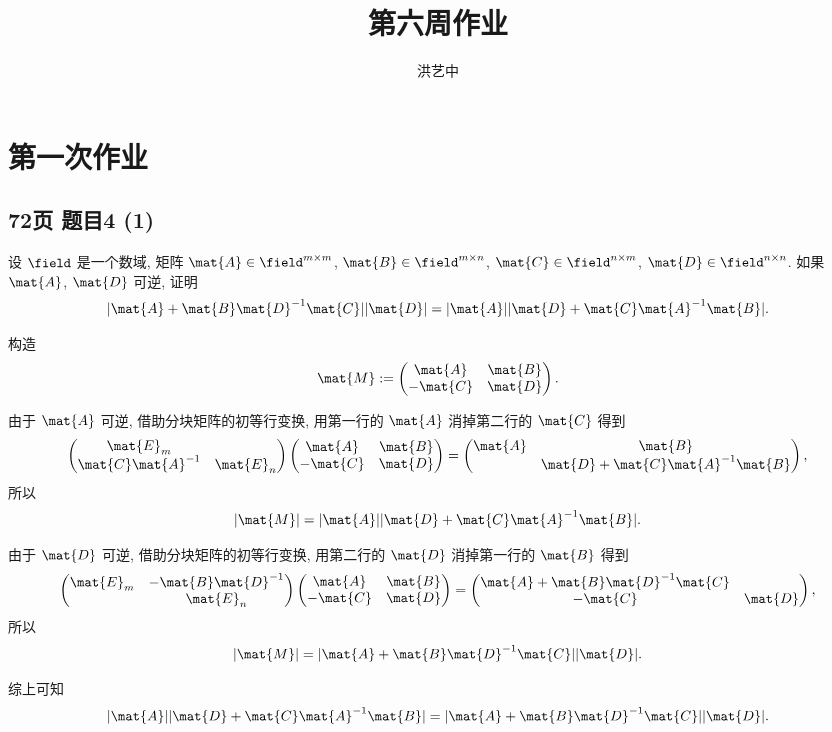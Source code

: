 \title{第六周作业}
\author{洪艺中}
\maketitle
\section{第一次作业}
\subsection*{72页 题目4 (1)}
\begin{problem*}
设 $\field$ 是一个数域, 矩阵 $\mat{A} \in \field^{m \times m}$, $\mat{B} \in \field^{m \times n}$, $\mat{C} \in \field^{n \times m}$, $\mat{D} \in \field^{n \times n}$. 如果 $\mat{A}$, $\mat{D}$ 可逆, 证明
\[
|\mat{A} + \mat{B}\mat{D}^{-1}\mat{C}||\mat{D}| = |\mat{A}||\mat{D} + \mat{C}\mat{A}^{-1}\mat{B}|.
\]
\end{problem*}
\begin{solution}
构造
\[
\mat{M} := 
\begin{pmatrix}
    \mat{A} & \mat{B} \\
    -\mat{C} & \mat{D}
\end{pmatrix}.
\]

由于 $\mat{A}$ 可逆, 借助分块矩阵的初等行变换, 用第一行的 $\mat{A}$ 消掉第二行的 $\mat{C}$ 得到
\[
\begin{pmatrix}
    \mat{E}_m &  \\
    \mat{C}\mat{A}^{-1} & \mat{E}_n
\end{pmatrix}
\begin{pmatrix}
    \mat{A} & \mat{B} \\
    -\mat{C} & \mat{D}
\end{pmatrix}
=
\begin{pmatrix}
    \mat{A} & \mat{B} \\
            & \mat{D} + \mat{C}\mat{A}^{-1}\mat{B}
\end{pmatrix},
\]
所以
\[
|\mat{M}| = |\mat{A}||\mat{D} + \mat{C}\mat{A}^{-1}\mat{B}|.
\]

由于 $\mat{D}$ 可逆, 借助分块矩阵的初等行变换, 用第二行的 $\mat{D}$ 消掉第一行的 $\mat{B}$ 得到
\[
\begin{pmatrix}
    \mat{E}_m & -\mat{B}\mat{D}^{-1} \\
     & \mat{E}_n
\end{pmatrix}
\begin{pmatrix}
    \mat{A} & \mat{B} \\
    -\mat{C} & \mat{D}
\end{pmatrix}
=
\begin{pmatrix}
    \mat{A} + \mat{B}\mat{D}^{-1}\mat{C} &  \\
    -\mat{C} & \mat{D} 
\end{pmatrix},
\]
所以
\[
|\mat{M}| = |\mat{A} + \mat{B}\mat{D}^{-1}\mat{C}||\mat{D}|.
\]

综上可知
\[
    |\mat{A}||\mat{D} + \mat{C}\mat{A}^{-1}\mat{B}| = |\mat{A} + \mat{B}\mat{D}^{-1}\mat{C}||\mat{D}|.
\]
\end{solution}

